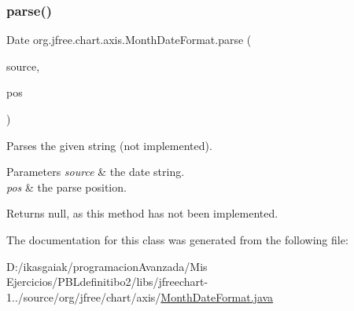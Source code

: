 \subsubsection{\texorpdfstring{parse()}{parse()}}
{\footnotesize\ttfamily Date org.\+jfree.\+chart.\+axis.\+Month\+Date\+Format.\+parse (\begin{DoxyParamCaption}\item[{String}]{source,  }\item[{Parse\+Position}]{pos }\end{DoxyParamCaption})}

Parses the given string (not implemented).


\begin{DoxyParams}{Parameters}
{\em source} & the date string. \\
\hline
{\em pos} & the parse position.\\
\hline
\end{DoxyParams}
\begin{DoxyReturn}{Returns}
{\ttfamily null}, as this method has not been implemented. 
\end{DoxyReturn}


The documentation for this class was generated from the following file\+:\begin{DoxyCompactItemize}
\item 
D\+:/ikasgaiak/programacion\+Avanzada/\+Mis Ejercicios/\+P\+B\+Ldefinitibo2/libs/jfreechart-\/1../source/org/jfree/chart/axis/\mbox{\hyperlink{_month_date_format_8java}{Month\+Date\+Format.\+java}}\end{DoxyCompactItemize}
